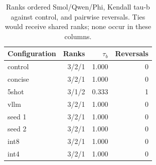 \begin{table}[tbp]
\centering\small
\caption{Ranks ordered Smol/Qwen/Phi, Kendall tau-b against control, and pairwise reversals. Ties would receive shared ranks; none occur in these columns.}\label{tab:ranking}
\begin{tabular}{lrrr}\toprule
Configuration & Ranks & $\tau_b$ & Reversals \\
\midrule
control & 3/2/1 & 1.000 & 0 \\
concise & 3/2/1 & 1.000 & 0 \\
5shot & 3/1/2 & 0.333 & 1 \\
vllm & 3/2/1 & 1.000 & 0 \\
seed 1 & 3/2/1 & 1.000 & 0 \\
seed 2 & 3/2/1 & 1.000 & 0 \\
int8 & 3/2/1 & 1.000 & 0 \\
int4 & 3/2/1 & 1.000 & 0 \\
\bottomrule\end{tabular}
\end{table}
